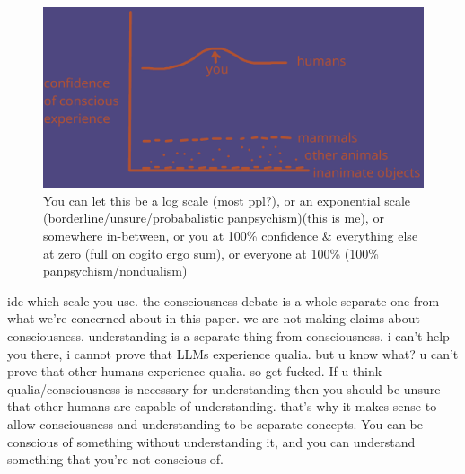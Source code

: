 \documentclass{article}
\begin{document}
\begin{figure}[h]
    \centering
    \includegraphics[width=\textwidth]{image.png}
    \caption{You can let this be a log scale (most ppl?), or an exponential scale (borderline/unsure/probabalistic panpsychism)(this is me), or somewhere in-between, or you at 100\% confidence & everything else at zero (full on cogito ergo sum), or everyone at 100\% (100\% panpsychism/nondualism)}
    \label{fig:enter-label}
\end{figure}
idc which scale you use. the consciousness debate is a whole separate one from what we're concerned about in this paper. we are not making claims about consciousness. understanding is a separate thing from consciousness. i can't help you there, i cannot prove that LLMs experience qualia. but u know what? u can't prove that other humans experience qualia. so get fucked. If u think qualia/consciousness is necessary for understanding then you should be unsure that other humans are capable of understanding. that's why it makes sense to allow consciousness and understanding to be separate concepts. You can be conscious of something without understanding it, and you can understand something that you're not conscious of. \par
\end{document}
